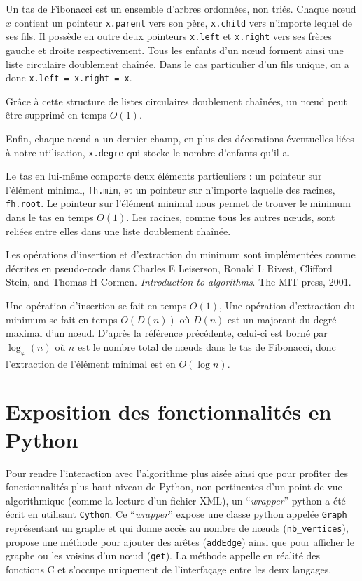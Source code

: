 \documentclass{article}
\begin{document}
  Un tas de Fibonacci est un ensemble d'arbres ordonnées, non triés. Chaque nœud $x$ contient un pointeur \texttt{x.parent} vers son père, \texttt{x.child} vers n'importe lequel de ses fils. Il possède en outre deux pointeurs \texttt{x.left} et \texttt{x.right} vers ses frères gauche et droite respectivement. Tous les enfants d'un nœud forment ainsi une liste circulaire doublement chaînée. Dans le cas particulier d'un fils unique, on a donc \texttt{x.left = x.right = x}.

  Grâce à cette structure de listes circulaires doublement chaînées, un nœud peut être supprimé en temps $O(1)$.

  Enfin, chaque nœud a un dernier champ, en plus des décorations éventuelles liées à notre utilisation, \texttt{x.degre} qui stocke le nombre d'enfants qu'il a.

  Le tas en lui-même comporte deux éléments particuliers : un pointeur sur l'élément minimal, \texttt{fh.min}, et un pointeur sur n'importe laquelle des racines, \texttt{fh.root}. Le pointeur sur l'élément minimal nous permet de trouver le minimum dans le tas en temps $O(1)$. Les racines, comme tous les autres nœuds, sont reliées entre elles dans une liste doublement chaînée.

  Les opérations d'insertion et d'extraction du minimum sont implémentées comme décrites en pseudo-code dans Charles E Leiserson, Ronald L Rivest, Clifford Stein, and Thomas H Cormen. \emph{Introduction to algorithms}. The MIT press, 2001.

  Une opération d'insertion se fait en temps $O(1)$, Une opération d'extraction du minimum se fait en temps $O(D(n))$ où $D(n)$ est un majorant du degré maximal d'un nœud. D'après la référence précédente, celui-ci est borné par $\log_\varphi \left(n\right)$ où $n$ est le nombre total de nœuds dans le tas de Fibonacci, donc l'extraction de l'élément minimal est en $O(\log n)$.

\section{Exposition des fonctionnalités en
  Python}\label{sec:expos-des-fonct}
Pour rendre l'interaction avec l'algorithme plus aisée ainsi que pour
profiter des fonctionnalités plus haut niveau de Python, non
pertinentes d'un point de vue algorithmique (comme la lecture d'un
fichier XML), un ``\emph{wrapper}'' python a été écrit en utilisant
\texttt{Cython}. Ce ``\emph{wrapper}'' expose une classe python appelée \verb|Graph|
représentant un graphe et qui donne accès au nombre de nœuds
(\verb|nb_vertices|), propose une méthode pour ajouter des arêtes
(\verb|addEdge|) ainsi que pour afficher le graphe ou les voisins d'un
nœud (\verb|get|). La méthode appelle en réalité des fonctions C et
s'occupe uniquement de l'interfaçage entre les deux langages.
\end{document}
